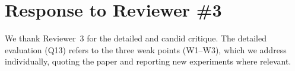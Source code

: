 \section*{Response to Reviewer \#3}
We thank Reviewer~3 for the detailed and candid critique. The detailed evaluation (Q13) refers to the three weak points (W1--W3), which we address individually, quoting the paper and reporting new experiments where relevant.




